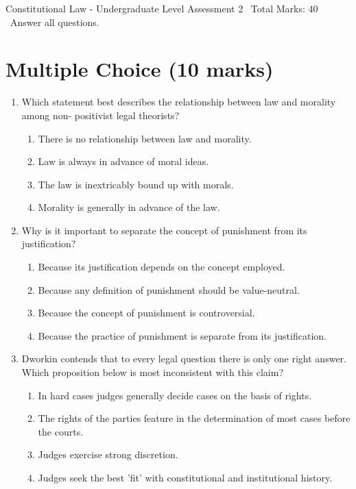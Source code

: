 \documentclass[12pt]{article}
\begin{document}
\begin{center}
Constitutional Law - Undergraduate Level Assessment 2 \
Total Marks: 40 \
Answer all questions.
\end{center}

\section*{Multiple Choice (10 marks)}
\begin{enumerate}[label=\arabic*.]
\item Which statement best describes the relationship between law and morality among non- positivist legal theorists?
\begin{enumerate}[label=(\alph*)]
    \item There is no relationship between law and morality.
    \item Law is always in advance of moral ideas.
    \item The law is inextricably bound up with morals.
    \item Morality is generally in advance of the law.
\end{enumerate}
\item Why is it important to separate the concept of punishment from its justification?
\begin{enumerate}[label=(\alph*)]
    \item Because its justification depends on the concept employed.
    \item Because any definition of punishment should be value-neutral.
    \item Because the concept of punishment is controversial.
    \item Because the practice of punishment is separate from its justification.
\end{enumerate}
\item Dworkin contends that to every legal question there is only one right answer. Which proposition below is most inconsistent with this claim?
\begin{enumerate}[label=(\alph*)]
    \item In hard cases judges generally decide cases on the basis of rights.
    \item The rights of the parties feature in the determination of most cases before the courts.
    \item Judges exercise strong discretion.
    \item Judges seek the best 'fit' with constitutional and institutional history.

\end{enumerate}
\end{enumerate}
\end{document}
